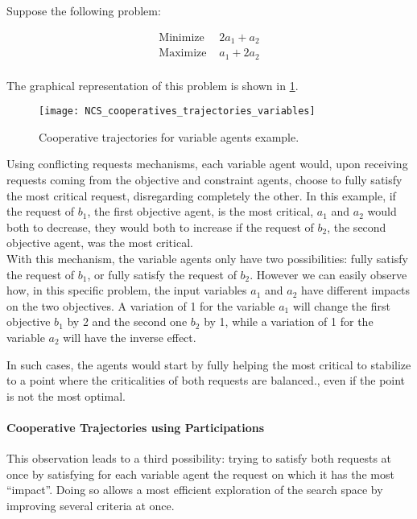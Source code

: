 Suppose the following problem:

\begin{align*}
\text{Minimize } &2a_1 + a_2\\
\text{Maximize } &a_1 + 2a_2\\
\end{align*}

The graphical representation of this problem is shown in \figurename{} \ref{NCS_cooperatives_trajectories_variables}.

\begin{figure}
\centering
\texttt{[image: NCS\_cooperatives\_trajectories\_variables]}
\caption{Cooperative trajectories for variable agents example.}\label{NCS_cooperatives_trajectories_variables}
\end{figure}

Using conflicting requests mechanisms, each variable agent would, upon receiving requests coming from the objective and constraint agents, choose to fully satisfy the most critical request, disregarding completely the other. In this example, if the request of $b_1$, the first objective agent, is the most critical, $a_1$ and $a_2$ would both to decrease, they would both to increase if the request of $b_2$, the second objective agent, was the most critical.\\
With this mechanism, the variable agents only have two possibilities: fully satisfy the request of $b_1$, or fully satisfy the request of $b_2$. However we can easily observe how, in this specific problem, the input variables $a_1$ and $a_2$ have different impacts on the two objectives. A variation of 1 for the variable $a_1$ will change the first objective $b_1$ by 2 and the second one $b_2$ by 1, while a variation of 1 for the variable $a_2$ will have the inverse effect.

In such cases, the agents would start by fully helping the most critical to stabilize to a point where the criticalities of both requests are balanced., even if the point is not the most optimal.

\paragraph*{Cooperative Trajectories using Participations}
This observation leads to a third possibility: trying to satisfy both requests at once by satisfying for each variable agent the request on which it has the most \enquote{impact}. Doing so allows a most efficient exploration of the search space by improving several criteria at once. 

